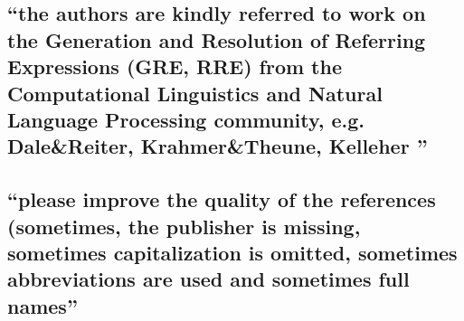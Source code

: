 \documentclass{article}
\begin{document}
\subsection{``the authors are kindly referred to work on the Generation and
Resolution of Referring Expressions (GRE, RRE) from the Computational
Linguistics and Natural Language Processing community, e.g. Dale\&Reiter,
Krahmer\&Theune, Kelleher ''}

\subsection{``please improve the quality of the references (sometimes, the
publisher is missing, sometimes capitalization is omitted, sometimes
abbreviations are used and sometimes full names''}
\end{document}
